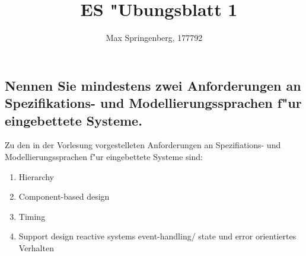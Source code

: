 \documentclass{article}
\author{Max Springenberg, 177792}
\title{\
    ES "Ubungsblatt 1
    }
\date{}
\begin{document}
\maketitle
\newpage

\subsection{Nennen Sie mindestens zwei Anforderungen an Spezifikations- und 
            Modellierungssprachen f"ur eingebettete Systeme.}

Zu den in der Vorlesung vorgestelleten Anforderungen an Spezifiations- und 
    Modellierungssprachen f"ur eingebettete Systeme sind:\\
\begin{enumerate}
    \item Hierarchy
    \item Component-based design
    \item Timing
    \item Support design reactive systems
        \subitem event-handling/ state und error orientiertes Verhalten
\end{enumerate}
\end{document}
